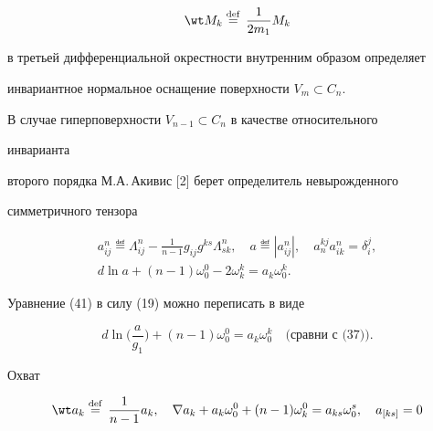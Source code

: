 \begin{equation} 


\wt M_k\eqdef\frac{1}{2m_1}M_k 


\end{equation} 


в третьей дифференциальной окрестности внутренним образом определяет 


инвариантное нормальное оснащение поверхности $V_m\subset C_n$. 


 


В случае гиперповерхности $V_{n-1}\subset C_n$ в качестве относительного 


инварианта 


второго порядка М.А.\,Акивис [2] берет определитель невырожденного 


симметричного тензора 


\begin{gather} 


a^n_{ij}\eqdef\Lambda^n_{ij}-\frac{1}{n-1}g_{ij} 


g^{k s}\Lambda^n_{s k},\quad 


a\eqdef|a^n_{ij}|,\quad a^{k j}_n a^n_{ik}=\delta^j_i,\\ 


% 


d\ln a+(n-1)\omega^0_0-2\omega^k_k=a_k\omega^k_0. 


\end{gather} 


Уравнение (41) в силу (19) можно переписать в виде 


\begin{equation} 


d\ln\bigg(\frac{a}{g_1} \bigg)+(n-1)\omega^0_0= 


a_k\omega^k_0\quad 


\text{(сравни с (37)).} 


\tag{$41'$}


\end{equation} 


Охват %


\begin{equation} 


\wt a_k\eqdef\frac{1}{n-1}a_k,\quad 


\nabla a_k+a_k\omega^0_0+(n-1)\omega^0_k=a_{k s}\omega^s_0,\quad 


a_{[k s]}=0 


\end{equation} 


